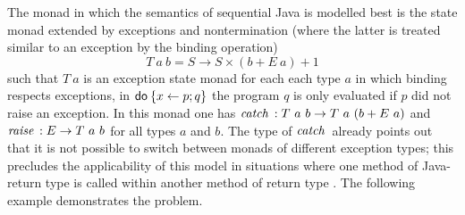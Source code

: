 The monad in which the semantics of sequential Java is modelled best is the
state monad extended by exceptions and nontermination (where the latter is
treated similar to an exception by the binding operation)
\[
T\ a\ b = S \to S \times (b + E\ a) + 1
\]
such that $T\ a$ is an exception state monad for each each type $a$ in which
binding respects exceptions, \IE in $\mathsf{do}\: \{x\gets p; q\}$ the program $q$ is only
evaluated if $p$ did not raise an exception. In this monad one has $\mathit{catch}\, :
T\ a\ b \to T\ a\ (b + E\ a)$ and $\mathit{raise}\, : E \to T\ a\ b$ for all types $a$ and
$b$. The type of $\mathit{catch}\,$ already points out that it is not possible to switch
between monads of different exception types; this precludes the applicability of
this model in situations where \EG one method of Java-return type  is
called within another method of return type . The following
example demonstrates the problem. 
